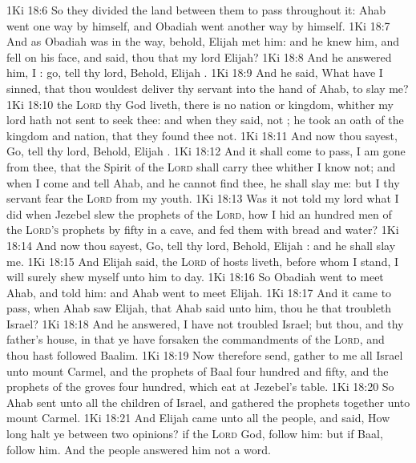 \vs 1Ki 18:6 So they divided the land between them to pass throughout it: Ahab went one way by himself, and Obadiah went another way by himself.
\vs 1Ki 18:7 And as Obadiah was in the way, behold, Elijah met him: and he knew him, and fell on his face, and said,  thou that my lord Elijah?
\vs 1Ki 18:8 And he answered him, I : go, tell thy lord, Behold, Elijah .
\vs 1Ki 18:9 And he said, What have I sinned, that thou wouldest deliver thy servant into the hand of Ahab, to slay me?
\vs 1Ki 18:10  the \textsc{Lord} thy God liveth, there is no nation or kingdom, whither my lord hath not sent to seek thee: and when they said,  not ; he took an oath of the kingdom and nation, that they found thee not.
\vs 1Ki 18:11 And now thou sayest, Go, tell thy lord, Behold, Elijah .
\vs 1Ki 18:12 And it shall come to pass,  I am gone from thee, that the Spirit of the \textsc{Lord} shall carry thee whither I know not; and  when I come and tell Ahab, and he cannot find thee, he shall slay me: but I thy servant fear the \textsc{Lord} from my youth.
\vs 1Ki 18:13 Was it not told my lord what I did when Jezebel slew the prophets of the \textsc{Lord}, how I hid an hundred men of the \textsc{Lord's} prophets by fifty in a cave, and fed them with bread and water?
\vs 1Ki 18:14 And now thou sayest, Go, tell thy lord, Behold, Elijah : and he shall slay me.
\vs 1Ki 18:15 And Elijah said,  the \textsc{Lord} of hosts liveth, before whom I stand, I will surely shew myself unto him to day.
\vs 1Ki 18:16 So Obadiah went to meet Ahab, and told him: and Ahab went to meet Elijah.
\vs 1Ki 18:17 And it came to pass, when Ahab saw Elijah, that Ahab said unto him,  thou he that troubleth Israel?
\vs 1Ki 18:18 And he answered, I have not troubled Israel; but thou, and thy father's house, in that ye have forsaken the commandments of the \textsc{Lord}, and thou hast followed Baalim.
\vs 1Ki 18:19 Now therefore send,  gather to me all Israel unto mount Carmel, and the prophets of Baal four hundred and fifty, and the prophets of the groves four hundred, which eat at Jezebel's table.
\vs 1Ki 18:20 So Ahab sent unto all the children of Israel, and gathered the prophets together unto mount Carmel.
\vs 1Ki 18:21 And Elijah came unto all the people, and said, How long halt ye between two opinions? if the \textsc{Lord}  God, follow him: but if Baal,  follow him. And the people answered him not a word.
